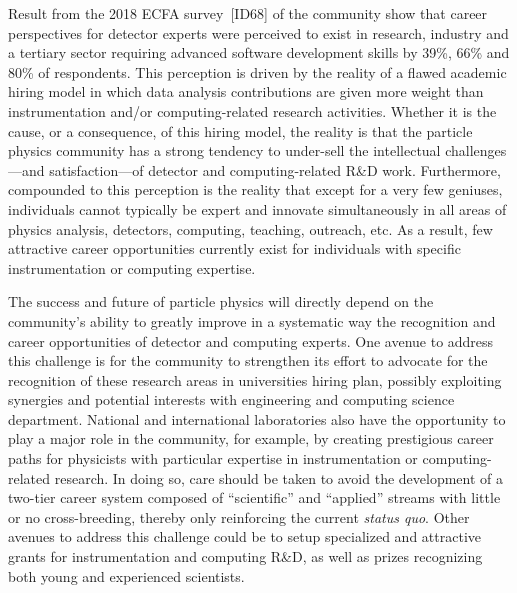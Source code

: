 Result from the 2018 ECFA survey~[ID68] of the community show that career perspectives for detector experts were perceived to exist in research, industry and a tertiary sector requiring advanced software development skills by 39\%, 66\% and 80\% of respondents.  This perception is driven by the reality of a flawed academic hiring model in which data analysis contributions are given more weight than instrumentation and/or computing-related research activities.  Whether it is the cause, or a consequence, of this hiring model, the reality is that the particle physics community has a strong tendency to under-sell the intellectual challenges---and satisfaction---of detector and computing-related R\&D work. 
Furthermore, compounded to this perception is the reality that except for a very few geniuses, individuals cannot typically be expert and innovate simultaneously in all areas of physics analysis, detectors, computing, teaching, outreach, etc.  As a result, few attractive career opportunities currently exist for individuals with specific instrumentation or computing expertise.   

The success and future of particle physics will directly depend on the community's ability to greatly improve in a systematic way the recognition and career opportunities of detector and computing experts.  One avenue to address this challenge is for the community to strengthen its effort to advocate for the recognition of these research areas in universities hiring plan, possibly exploiting synergies and potential interests with engineering and computing science department.  National and international laboratories also have the opportunity to play a major role in the community, for example, by creating prestigious career paths for physicists with particular expertise in instrumentation or computing-related research.  In doing so, care should be taken to avoid the development of a two-tier career system composed of ``scientific'' and ``applied'' streams with little or no cross-breeding, thereby only reinforcing the current {\it status quo}.  Other avenues to address this challenge could be to setup specialized and attractive grants for instrumentation and computing R\&D, as well as prizes recognizing both young and experienced scientists. 








